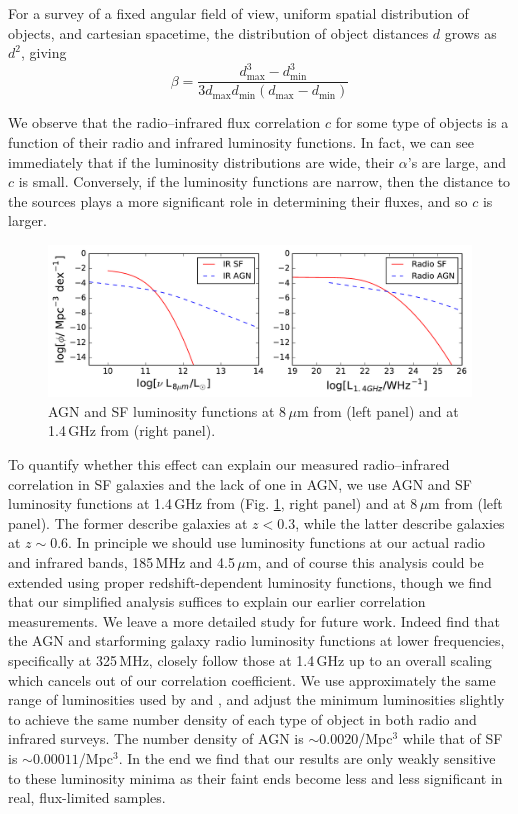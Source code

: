 \documentclass[numberedappendix]{emulateapj}
\newcommand{\mintext}{\text{min}}
\newcommand{\maxtext}{\text{max}}
\begin{document}
For a survey of a fixed angular field of view, uniform spatial distribution of objects, and cartesian spacetime, the distribution of object distances $d$ grows as $d^2$, giving 
\begin{equation}
	\beta=\frac{d_\maxtext^3-d_\mintext^3}{3d_\maxtext d_\mintext (d_\maxtext-d_\mintext)}
\end{equation}

We observe that the radio--infrared flux correlation $c$ for some type of objects is a function of their radio and infrared luminosity functions. In fact, we can see immediately that if the luminosity distributions are wide, their $\alpha$'s are large, and $c$ is small. Conversely, if the luminosity functions are narrow, then the distance to the sources plays a more significant role in determining their fluxes, and so $c$ is larger. 

\begin{figure}[h]
\centering
\includegraphics[width=6in]{images/sim_rad_ir_luminosity_functions.pdf}
\caption{AGN and SF luminosity functions at 8\,$\mu$m from \citet{fu10} (left panel) and at 1.4\,GHz from \citet{mauch07} (right panel).}
\label{fig:luminosityfunctions}
\end{figure}

To quantify whether this effect can explain our measured radio--infrared correlation in SF galaxies and the lack of one in AGN, we use AGN and SF luminosity functions at 1.4\,GHz from \citet{mauch07} (Fig. \ref{fig:luminosityfunctions}, right panel) and at 8\,$\mu$m from \citet{fu10} (left panel). The former describe galaxies at $z<0.3$, while the latter describe galaxies at $z\sim0.6$. In principle we should use luminosity functions at our actual radio and infrared bands, 185\,MHz and 4.5\,$\mu$m, and of course this analysis could be extended using proper redshift-dependent luminosity functions, though we find that our simplified analysis suffices to explain our earlier correlation measurements. We leave a more detailed study for future work. Indeed \citet{prescott16} find that the AGN and starforming galaxy radio luminosity functions at lower frequencies, specifically at 325\,MHz, closely follow those at 1.4\,GHz up to an overall scaling which cancels out of our correlation coefficient. We use approximately the same range of luminosities used by \citet{mauch07} and \citet{fu10}, and adjust the minimum luminosities slightly to achieve the same number density of each type of object in both radio and infrared surveys. The number density of AGN is $\sim0.0020$/Mpc$^3$ while that of SF is $\sim0.00011$/Mpc$^3$. In the end we find that our results are only weakly sensitive to these luminosity minima as their faint ends become less and less significant in real, flux-limited samples. 
\end{document}
